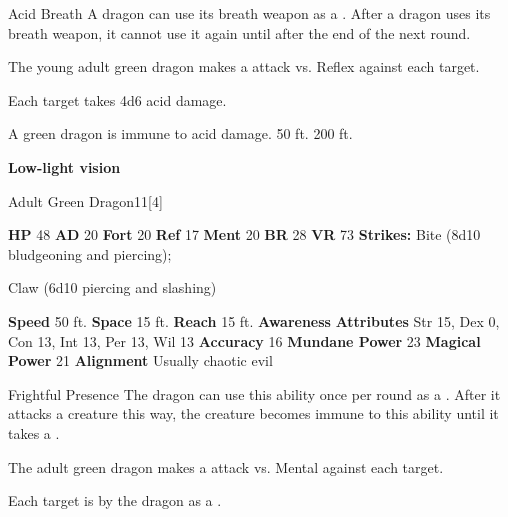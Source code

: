     \begin{freeability}{Acid Breath}
      A dragon can use its breath weapon as a .
      After a dragon uses its breath weapon, it cannot use it again until after the end of the next round.
      \par The young adult green dragon makes a  attack
        vs. Reflex against each target.
    
    \hit Each target takes 4d6 acid damage.
    \end{freeability}
  
      
       A green dragon is immune to acid damage.
     50 ft.
     200 ft.
    \par\noindent\textbf{Low-light vision}
  

  \begin{monsubsection}{Adult Green Dragon}{11}[4]
    \vspace{-1em}\vspace{-1em}
    \vspace{0em}

    
    

    \begin{spellcontent}
      \begin{spelltargetinginfo}
        \pari \textbf{HP} 48 \monsep
          \textbf{AD} 20 \monsep
          \textbf{Fort} 20 \monsep
          \textbf{Ref} 17 \monsep
          \textbf{Ment} 20
        \pari \textbf{BR} 28 \monsep
        \textbf{VR} 73
        \pari \textbf{Strikes:}
            Bite  (8d10 bludgeoning and piercing);
\par Claw  (6d10 piercing and slashing)
      \end{spelltargetinginfo}
    \end{spellcontent}
    \begin{monsterfooter}
      \pari \textbf{Speed} 50 ft. \monsep
        \textbf{Space} 15 ft. \monsep
        \textbf{Reach} 15 ft.
      \pari \textbf{Awareness} 
      \pari \textbf{Attributes}
        Str 15, Dex 0,
        Con 13, Int 13,
        Per 13, Wil 13
      \pari \textbf{Accuracy} 16 \monsep
        \textbf{Mundane Power} 23 \monsep
      \textbf{Magical Power} 21
      \pari \textbf{Alignment} Usually chaotic evil
    \end{monsterfooter}
  \end{monsubsection}
  \begin{freeability}{Frightful Presence}
      The dragon can use this ability once per round as a .
      After it attacks a creature this way, the creature becomes immune to this ability until it takes a .
      \par The adult green dragon makes a  attack
        vs. Mental against each target.
    
    \hit Each target is  by the dragon as a .
    \end{freeability}
  

